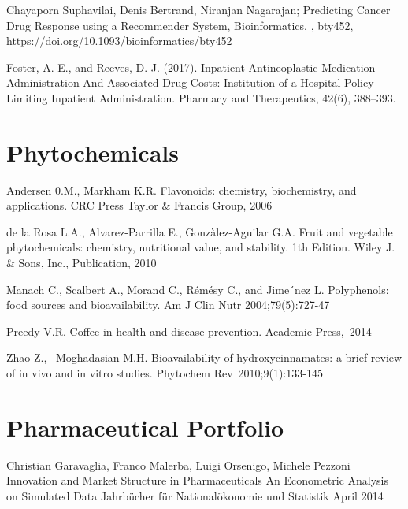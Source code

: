 \begin{thebibliography}{00}
 Chayaporn Suphavilai, Denis Bertrand, Niranjan Nagarajan; 
\newblock Predicting Cancer Drug Response using a Recommender System, 
\newblock Bioinformatics, , bty452, https://doi.org/10.1093/bioinformatics/bty452

Foster, A. E., and Reeves, D. J. (2017). 
\newblock Inpatient Antineoplastic Medication Administration And Associated Drug Costs: Institution of a Hospital Policy Limiting Inpatient Administration. 
\newblock Pharmacy and Therapeutics, 42(6), 388–393.
\section{Phytochemicals}

Andersen 0.M., Markham K.R. 
\newblock Flavonoids: chemistry, biochemistry, and applications. 
\newblock CRC Press Taylor & Francis Group, 2006

de la Rosa L.A., Alvarez-Parrilla E., Gonzàlez-Aguilar G.A. 
\newblock Fruit and vegetable phytochemicals: chemistry, nutritional value, and stability. 
\newblock 1th Edition. Wiley J. & Sons, Inc., Publication, 2010

Manach C., Scalbert A., Morand C., Rémésy C., and Jime´nez L. 
\newblock Polyphenols: food sources and bioavailability. 
\newblock Am J Clin Nutr 2004;79(5):727-47

Preedy V.R. 
\newblock Coffee in health and disease prevention. 
\newblock Academic Press, 2014

Zhao Z.,  Moghadasian M.H. 
\newblock Bioavailability of hydroxycinnamates: a brief review of in vivo and in vitro studies. 
\newblock Phytochem Rev 2010;9(1):133-145
\section{Pharmaceutical Portfolio}

 Christian Garavaglia, Franco Malerba, Luigi Orsenigo, Michele Pezzoni
\newblock Innovation and Market Structure in Pharmaceuticals An Econometric Analysis on Simulated Data
\newblock Jahrbücher für Nationalökonomie und Statistik April 2014


\end{thebibliography}
